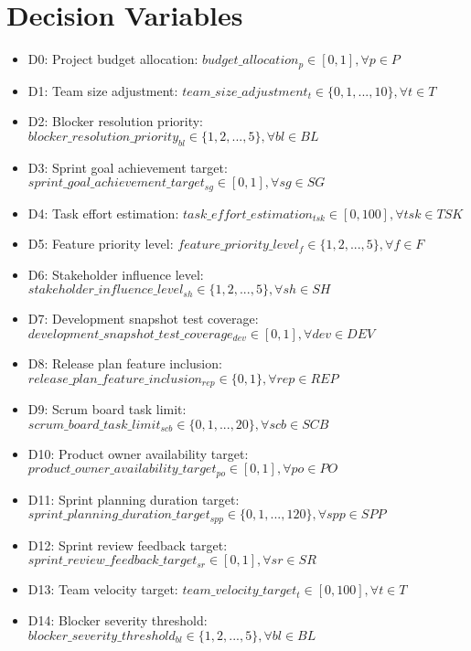 \documentclass{article}
\begin{document}
\section{Decision Variables}
\begin{itemize}
    \item D0: Project budget allocation: $budget\_allocation_p \in [0, 1], \forall p \in P$
    \item D1: Team size adjustment: $team\_size\_adjustment_t \in \{0, 1, ..., 10\}, \forall t \in T$
    \item D2: Blocker resolution priority: $blocker\_resolution\_priority_{bl} \in \{1, 2, ..., 5\}, \forall bl \in BL$
    \item D3: Sprint goal achievement target: $sprint\_goal\_achievement\_target_{sg} \in [0, 1], \forall sg \in SG$
    \item D4: Task effort estimation: $task\_effort\_estimation_{tsk} \in [0, 100], \forall tsk \in TSK$
    \item D5: Feature priority level: $feature\_priority\_level_f \in \{1, 2, ..., 5\}, \forall f \in F$
    \item D6: Stakeholder influence level: $stakeholder\_influence\_level_{sh} \in \{1, 2, ..., 5\}, \forall sh \in SH$
    \item D7: Development snapshot test coverage: $development\_snapshot\_test\_coverage_{dev} \in [0, 1], \forall dev \in DEV$
    \item D8: Release plan feature inclusion: $release\_plan\_feature\_inclusion_{rep} \in \{0, 1\}, \forall rep \in REP$
    \item D9: Scrum board task limit: $scrum\_board\_task\_limit_{scb} \in \{0, 1, ..., 20\}, \forall scb \in SCB$
    \item D10: Product owner availability target: $product\_owner\_availability\_target_{po} \in [0, 1], \forall po \in PO$
    \item D11: Sprint planning duration target: $sprint\_planning\_duration\_target_{spp} \in \{0, 1, ..., 120\}, \forall spp \in SPP$
    \item D12: Sprint review feedback target: $sprint\_review\_feedback\_target_{sr} \in [0, 1], \forall sr \in SR$
    \item D13: Team velocity target: $team\_velocity\_target_t \in [0, 100], \forall t \in T$
    \item D14: Blocker severity threshold: $blocker\_severity\_threshold_{bl} \in \{1, 2, ..., 5\}, \forall bl \in BL$
\end{itemize}
\end{document}
